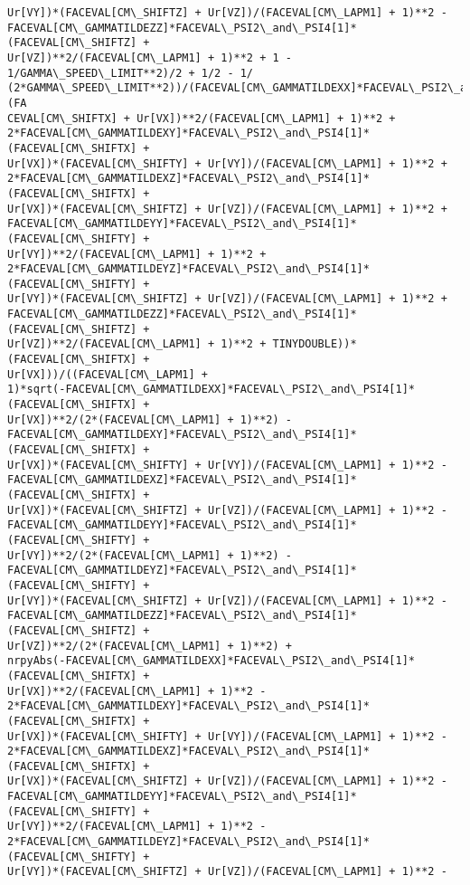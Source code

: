 \documentclass[landscape,letterpaper,10pt,english]{article}
\begin{document}
\begin{Verbatim}[commandchars=\\\{\}]
Ur[VY])*(FACEVAL[CM\_SHIFTZ] + Ur[VZ])/(FACEVAL[CM\_LAPM1] + 1)**2 -
FACEVAL[CM\_GAMMATILDEZZ]*FACEVAL\_PSI2\_and\_PSI4[1]*(FACEVAL[CM\_SHIFTZ] +
Ur[VZ])**2/(FACEVAL[CM\_LAPM1] + 1)**2 + 1 - 1/GAMMA\_SPEED\_LIMIT**2)/2 + 1/2 - 1/
(2*GAMMA\_SPEED\_LIMIT**2))/(FACEVAL[CM\_GAMMATILDEXX]*FACEVAL\_PSI2\_and\_PSI4[1]*(FA
CEVAL[CM\_SHIFTX] + Ur[VX])**2/(FACEVAL[CM\_LAPM1] + 1)**2 +
2*FACEVAL[CM\_GAMMATILDEXY]*FACEVAL\_PSI2\_and\_PSI4[1]*(FACEVAL[CM\_SHIFTX] +
Ur[VX])*(FACEVAL[CM\_SHIFTY] + Ur[VY])/(FACEVAL[CM\_LAPM1] + 1)**2 +
2*FACEVAL[CM\_GAMMATILDEXZ]*FACEVAL\_PSI2\_and\_PSI4[1]*(FACEVAL[CM\_SHIFTX] +
Ur[VX])*(FACEVAL[CM\_SHIFTZ] + Ur[VZ])/(FACEVAL[CM\_LAPM1] + 1)**2 +
FACEVAL[CM\_GAMMATILDEYY]*FACEVAL\_PSI2\_and\_PSI4[1]*(FACEVAL[CM\_SHIFTY] +
Ur[VY])**2/(FACEVAL[CM\_LAPM1] + 1)**2 +
2*FACEVAL[CM\_GAMMATILDEYZ]*FACEVAL\_PSI2\_and\_PSI4[1]*(FACEVAL[CM\_SHIFTY] +
Ur[VY])*(FACEVAL[CM\_SHIFTZ] + Ur[VZ])/(FACEVAL[CM\_LAPM1] + 1)**2 +
FACEVAL[CM\_GAMMATILDEZZ]*FACEVAL\_PSI2\_and\_PSI4[1]*(FACEVAL[CM\_SHIFTZ] +
Ur[VZ])**2/(FACEVAL[CM\_LAPM1] + 1)**2 + TINYDOUBLE))*(FACEVAL[CM\_SHIFTX] +
Ur[VX]))/((FACEVAL[CM\_LAPM1] +
1)*sqrt(-FACEVAL[CM\_GAMMATILDEXX]*FACEVAL\_PSI2\_and\_PSI4[1]*(FACEVAL[CM\_SHIFTX] +
Ur[VX])**2/(2*(FACEVAL[CM\_LAPM1] + 1)**2) -
FACEVAL[CM\_GAMMATILDEXY]*FACEVAL\_PSI2\_and\_PSI4[1]*(FACEVAL[CM\_SHIFTX] +
Ur[VX])*(FACEVAL[CM\_SHIFTY] + Ur[VY])/(FACEVAL[CM\_LAPM1] + 1)**2 -
FACEVAL[CM\_GAMMATILDEXZ]*FACEVAL\_PSI2\_and\_PSI4[1]*(FACEVAL[CM\_SHIFTX] +
Ur[VX])*(FACEVAL[CM\_SHIFTZ] + Ur[VZ])/(FACEVAL[CM\_LAPM1] + 1)**2 -
FACEVAL[CM\_GAMMATILDEYY]*FACEVAL\_PSI2\_and\_PSI4[1]*(FACEVAL[CM\_SHIFTY] +
Ur[VY])**2/(2*(FACEVAL[CM\_LAPM1] + 1)**2) -
FACEVAL[CM\_GAMMATILDEYZ]*FACEVAL\_PSI2\_and\_PSI4[1]*(FACEVAL[CM\_SHIFTY] +
Ur[VY])*(FACEVAL[CM\_SHIFTZ] + Ur[VZ])/(FACEVAL[CM\_LAPM1] + 1)**2 -
FACEVAL[CM\_GAMMATILDEZZ]*FACEVAL\_PSI2\_and\_PSI4[1]*(FACEVAL[CM\_SHIFTZ] +
Ur[VZ])**2/(2*(FACEVAL[CM\_LAPM1] + 1)**2) +
nrpyAbs(-FACEVAL[CM\_GAMMATILDEXX]*FACEVAL\_PSI2\_and\_PSI4[1]*(FACEVAL[CM\_SHIFTX] +
Ur[VX])**2/(FACEVAL[CM\_LAPM1] + 1)**2 -
2*FACEVAL[CM\_GAMMATILDEXY]*FACEVAL\_PSI2\_and\_PSI4[1]*(FACEVAL[CM\_SHIFTX] +
Ur[VX])*(FACEVAL[CM\_SHIFTY] + Ur[VY])/(FACEVAL[CM\_LAPM1] + 1)**2 -
2*FACEVAL[CM\_GAMMATILDEXZ]*FACEVAL\_PSI2\_and\_PSI4[1]*(FACEVAL[CM\_SHIFTX] +
Ur[VX])*(FACEVAL[CM\_SHIFTZ] + Ur[VZ])/(FACEVAL[CM\_LAPM1] + 1)**2 -
FACEVAL[CM\_GAMMATILDEYY]*FACEVAL\_PSI2\_and\_PSI4[1]*(FACEVAL[CM\_SHIFTY] +
Ur[VY])**2/(FACEVAL[CM\_LAPM1] + 1)**2 -
2*FACEVAL[CM\_GAMMATILDEYZ]*FACEVAL\_PSI2\_and\_PSI4[1]*(FACEVAL[CM\_SHIFTY] +
Ur[VY])*(FACEVAL[CM\_SHIFTZ] + Ur[VZ])/(FACEVAL[CM\_LAPM1] + 1)**2 -

\end{Verbatim}
\end{document}

